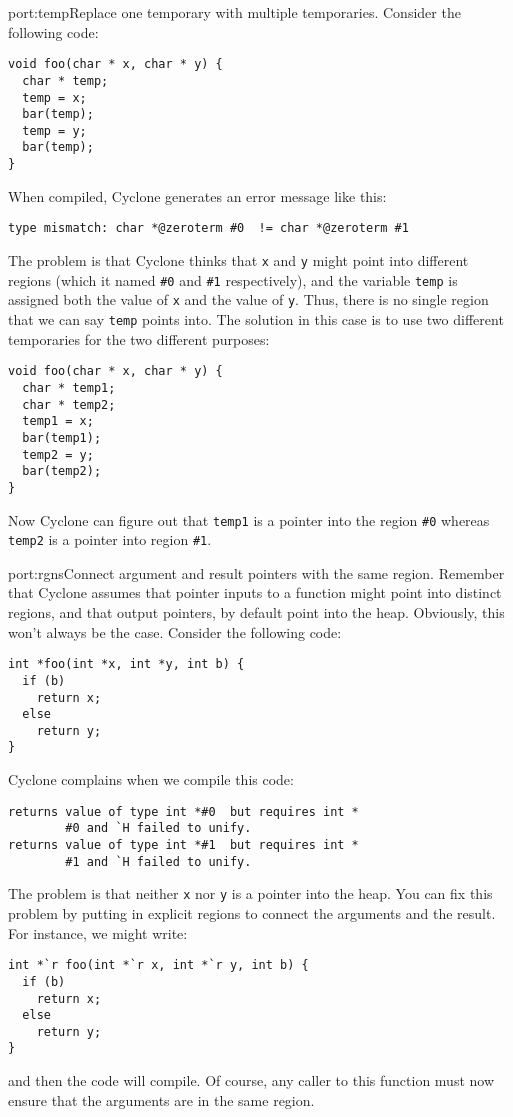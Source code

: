 \begin{porta}{port:temp}{Replace one temporary with multiple temporaries.}
Consider the following code:
\begin{verbatim}
void foo(char * x, char * y) {
  char * temp;
  temp = x;
  bar(temp);
  temp = y;
  bar(temp);
}
\end{verbatim}

When compiled, Cyclone generates an error message like this:
\begin{verbatim}
type mismatch: char *@zeroterm #0  != char *@zeroterm #1 
\end{verbatim}

The problem is that Cyclone thinks that \texttt{x} and \texttt{y}
might point into different regions (which it named \texttt{\#0} and
\texttt{\#1} respectively), and the variable \texttt{temp} is assigned
both the value of \texttt{x} and the value of \texttt{y}.  Thus,
there is no single region that we can say \texttt{temp} points into.
The solution in this case is to use two different temporaries for
the two different purposes:
\begin{verbatim}
void foo(char * x, char * y) {
  char * temp1;
  char * temp2;
  temp1 = x;
  bar(temp1);
  temp2 = y;
  bar(temp2);
}
\end{verbatim}

Now Cyclone can figure out that \texttt{temp1} is a pointer into
the region \texttt{\#0} whereas \texttt{temp2} is a pointer into
region \texttt{\#1}.  
\end{porta}

\begin{porta}{port:rgns}{Connect argument and result pointers with the same region.}
Remember that Cyclone assumes that pointer inputs to a function might
point into distinct regions, and that output pointers, by default point
into the heap.  Obviously, this won't always be the case.  Consider
the following code:
\begin{verbatim}
int *foo(int *x, int *y, int b) {
  if (b)
    return x;
  else
    return y;
}
\end{verbatim}

Cyclone complains when we compile this code:
\begin{verbatim}
returns value of type int *#0  but requires int *
        #0 and `H failed to unify. 
returns value of type int *#1  but requires int *
        #1 and `H failed to unify. 
\end{verbatim}
The problem is that neither \texttt{x} nor \texttt{y} is a pointer
into the heap.  You can fix this problem by putting in explicit regions
to connect the arguments and the result.  For instance, we might write:
\begin{verbatim}
int *`r foo(int *`r x, int *`r y, int b) {
  if (b)
    return x;
  else
    return y;
}
\end{verbatim}
and then the code will compile.  Of course, any caller to this function
must now ensure that the arguments are in the same region.  
\end{porta}


